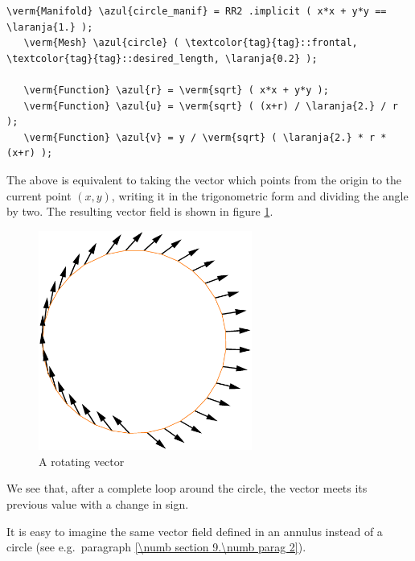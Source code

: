 \begin{Verbatim}[commandchars=\\\{\},formatcom=\small\tt,frame=single,
   label=parag-\ref{\numb section 7.\numb parag 24}.cpp,rulecolor=\color{moldura},
   baselinestretch=0.94,framesep=2mm                                              ]
   \verm{Manifold} \azul{circle_manif} = RR2 .implicit ( x*x + y*y == \laranja{1.} );
   \verm{Mesh} \azul{circle} ( \textcolor{tag}{tag}::frontal, \textcolor{tag}{tag}::desired_length, \laranja{0.2} );
  
   \verm{Function} \azul{r} = \verm{sqrt} ( x*x + y*y );
   \verm{Function} \azul{u} = \verm{sqrt} ( (x+r) / \laranja{2.} / r );
   \verm{Function} \azul{v} = y / \verm{sqrt} ( \laranja{2.} * r * (x+r) );
\end{Verbatim}

The above is equivalent to taking the vector which points from the origin to the current point $ (x,y) $,
writing it in the trigonometric form and dividing the angle by two.
The resulting vector field is shown in figure \ref{\numb section 7.\numb fig 22}.

\begin{figure}[ht] \centering
  \includegraphics[width=70mm]{circle-conca.eps}
  \caption{A rotating vector}
  \label{\numb section 7.\numb fig 22}
\end{figure}

We see that, after a complete loop around the circle,
the vector meets its previous value with a change in sign.

It is easy to imagine the same vector field defined in an annulus instead of a circle
(see e.g.\ paragraph \ref{\numb section 9.\numb parag 2}).

